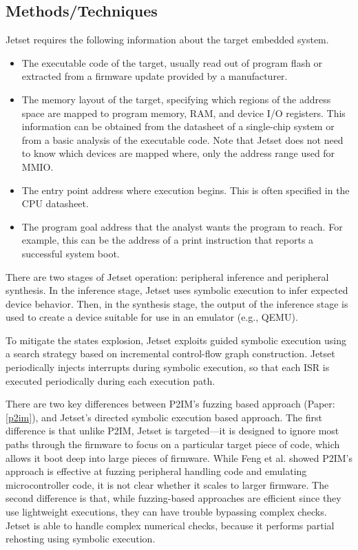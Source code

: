 \subsection{Methods/Techniques}
Jetset requires the following information about the target embedded system.
\begin{itemize}
\item The executable code of the target, usually read out of program flash or extracted from a firmware update provided by a manufacturer.
\item The memory layout of the target, specifying which regions of the address space are mapped to program memory, RAM, and device I/O registers. This information can be obtained from the datasheet of a single-chip system or from a basic analysis of the executable code. Note that Jetset does not need to know which devices are mapped where, only the address range used for MMIO.
\item The entry point address where execution begins. This is often specified in the CPU datasheet.
\item The program goal address that the analyst wants the program to reach. For example, this can be the address of a print instruction that reports a successful system boot.
\end{itemize}
There are two stages of Jetset operation: peripheral inference and peripheral synthesis. In the inference stage, Jetset uses symbolic execution to infer expected device behavior.  Then, in the synthesis stage, the output of the inference stage is used to create a device suitable for use in an emulator (e.g., QEMU).

{\color{blue}To mitigate the states explosion, Jetset exploits guided symbolic execution using a search strategy based on incremental control-flow graph construction.  Jetset periodically injects interrupts during symbolic execution, so that each ISR is executed periodically during each execution path. }

There are two key differences between P2IM’s fuzzing based approach (Paper: \ref{p2im}), and Jetset’s directed symbolic execution based approach. The first difference is that unlike P2IM, Jetset is targeted—it is designed to ignore most paths through the firmware to focus on a particular target piece of code, which allows it boot deep into large pieces of firmware. While Feng et al. showed P2IM’s approach is effective at fuzzing peripheral handling code and emulating microcontroller code, it is not clear whether it scales to larger firmware.  The second difference is that, while fuzzing-based approaches are efficient since they use lightweight executions, they can have trouble bypassing complex checks. Jetset is able to handle complex numerical checks, because it performs partial rehosting using symbolic execution.
